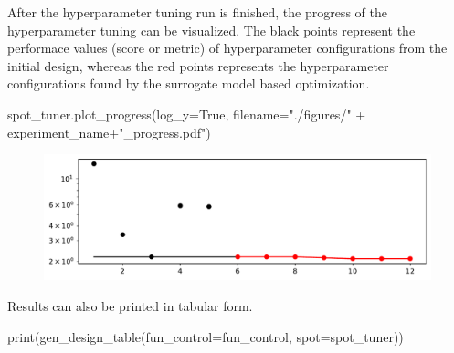\documentclass[
  letterpaper,
  DIV=11,
  numbers=noendperiod]{scrreprt}
\newenvironment{Shaded}{\begin{snugshade}}{\end{snugshade}}
\newcommand{\BuiltInTok}[1]{\textcolor[rgb]{0.00,0.23,0.31}{#1}}
\newcommand{\NormalTok}[1]{\textcolor[rgb]{0.00,0.23,0.31}{#1}}
\newcommand{\OperatorTok}[1]{\textcolor[rgb]{0.37,0.37,0.37}{#1}}
\newcommand{\StringTok}[1]{\textcolor[rgb]{0.13,0.47,0.30}{#1}}
\newcommand{\VariableTok}[1]{\textcolor[rgb]{0.07,0.07,0.07}{#1}}
\begin{document}
After the hyperparameter tuning run is finished, the progress of the
hyperparameter tuning can be visualized. The black points represent the
performace values (score or metric) of hyperparameter configurations
from the initial design, whereas the red points represents the
hyperparameter configurations found by the surrogate model based
optimization.

\begin{Shaded}
\begin{Highlighting}[]
\NormalTok{spot\_tuner.plot\_progress(log\_y}\OperatorTok{=}\VariableTok{True}\NormalTok{, filename}\OperatorTok{=}\StringTok{"./figures/"} \OperatorTok{+}\NormalTok{ experiment\_name}\OperatorTok{+}\StringTok{"\_progress.pdf"}\NormalTok{)}
\end{Highlighting}
\end{Shaded}

\begin{figure}[H]

{\centering \includegraphics{13_spot_hpt_river_files/figure-pdf/cell-21-output-1.pdf}

}

\end{figure}

Results can also be printed in tabular form.

\begin{Shaded}
\begin{Highlighting}[]
\BuiltInTok{print}\NormalTok{(gen\_design\_table(fun\_control}\OperatorTok{=}\NormalTok{fun\_control, spot}\OperatorTok{=}\NormalTok{spot\_tuner))}
\end{Highlighting}
\end{Shaded}
\end{document}
